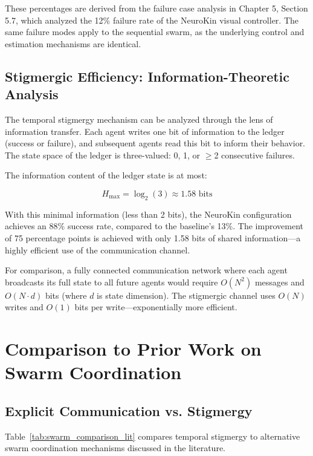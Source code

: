 \documentclass[12pt,a4paper,oneside]{report}
\begin{document}
These percentages are derived from the failure case analysis in Chapter 5, Section 5.7, which analyzed the 12\% failure rate of the NeuroKin visual controller. The same failure modes apply to the sequential swarm, as the underlying control and estimation mechanisms are identical.

\subsection{Stigmergic Efficiency: Information-Theoretic Analysis}

The temporal stigmergy mechanism can be analyzed through the lens of information transfer. Each agent writes one bit of information to the ledger (success or failure), and subsequent agents read this bit to inform their behavior. The state space of the ledger is three-valued: 0, 1, or $\geq$2 consecutive failures.

The information content of the ledger state is at most:

\begin{equation}
H_{\text{max}} = \log_2(3) \approx 1.58 \text{ bits}
\end{equation}

With this minimal information (less than 2 bits), the NeuroKin configuration achieves an 88\% success rate, compared to the baseline's 13\%. The improvement of 75 percentage points is achieved with only 1.58 bits of shared information—a highly efficient use of the communication channel.

For comparison, a fully connected communication network where each agent broadcasts its full state to all future agents would require $O(N^2)$ messages and $O(N \cdot d)$ bits (where $d$ is state dimension). The stigmergic channel uses $O(N)$ writes and $O(1)$ bits per write—exponentially more efficient.

\section{Comparison to Prior Work on Swarm Coordination}

\subsection{Explicit Communication vs. Stigmergy}

Table~\ref{tab:swarm_comparison_lit} compares temporal stigmergy to alternative swarm coordination mechanisms discussed in the literature.
\end{document}
